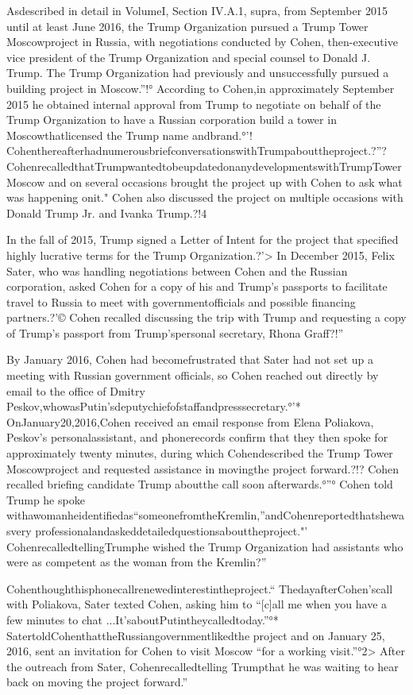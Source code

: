 Asdescribed in detail in VolumeI, Section IV.A.1, supra, from September 2015 until at least June 2016, the Trump Organization pursued a Trump Tower Moscowproject in Russia, with negotiations conducted by Cohen, then-executive vice president of the Trump Organization and special counsel to Donald J. Trump.%
The Trump Organization had previously and unsuccessfully pursued a building project in Moscow.”!° According to Cohen,in approximately September 2015 he obtained internal approval from Trump to negotiate on behalf of the Trump Organization to have a Russian corporation build a tower in Moscowthatlicensed the Trump name andbrand.°'! CohenthereafterhadnumerousbriefconversationswithTrumpabouttheproject.?”? CohenrecalledthatTrumpwantedtobeupdatedonanydevelopmentswithTrumpTowerMoscow and on several occasions brought the project up with Cohen to ask what was happening onit." Cohen also discussed the project on multiple occasions with Donald Trump Jr. and Ivanka Trump.?!4

In the fall of 2015, Trump signed a Letter of Intent for the project that specified highly lucrative terms for the Trump Organization.?'> In December 2015, Felix Sater, who was handling negotiations between Cohen and the Russian corporation, asked Cohen for a copy of his and Trump’s passports to facilitate travel to Russia to meet with governmentofficials and possible financing partners.?'© Cohen recalled discussing the trip with Trump and requesting a copy of Trump’s passport from Trump’spersonal secretary, Rhona Graff?!”

By January 2016, Cohen had becomefrustrated that Sater had not set up a meeting with Russian government officials, so Cohen reached out directly by email to the office of Dmitry Peskov,whowasPutin’sdeputychiefofstaffandpresssecretary.°'* OnJanuary20,2016,Cohen received an email response from Elena Poliakova, Peskov’s personalassistant, and phonerecords confirm that they then spoke for approximately twenty minutes, during which Cohendescribed the Trump Tower Moscowproject and requested assistance in movingthe project forward.?!? Cohen recalled briefing candidate Trump aboutthe call soon afterwards.°”° Cohen told Trump he spoke withawomanheidentifiedas“someonefromtheKremlin,”andCohenreportedthatshewasvery professionalandaskeddetailedquestionsabouttheproject."' CohenrecalledtellingTrumphe wished the Trump Organization had assistants who were as competent as the woman from the Kremlin?”

Cohenthoughthisphonecallrenewedinterestintheproject.“ ThedayafterCohen’scall with Poliakova, Sater texted Cohen, asking him to “[c]all me when you have a few minutes to chat ...It’saboutPutintheycalledtoday.”°* SatertoldCohenthattheRussiangovernmentlikedthe project and on January 25, 2016, sent an invitation for Cohen to visit Moscow “for a working visit.”°2> After the outreach from Sater, Cohenrecalledtelling Trumpthat he was waiting to hear back on moving the project forward.”


